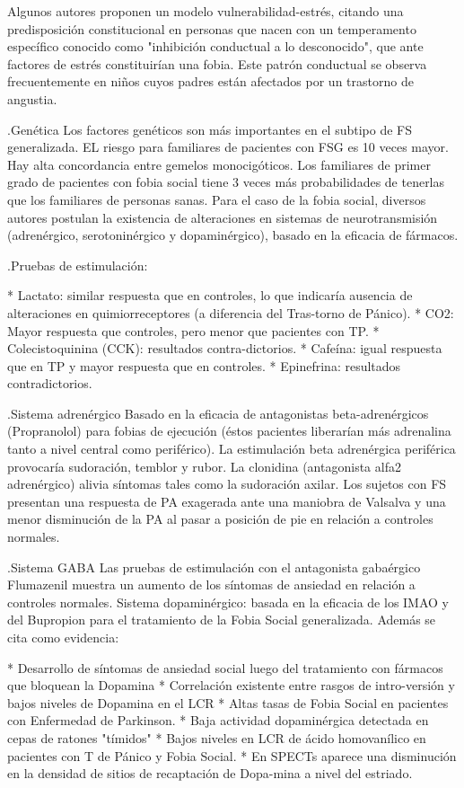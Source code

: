 Algunos autores proponen un modelo vulnerabilidad-estrés, citando una predisposición constitucional en personas que nacen con un temperamento específico conocido como "inhibición conductual a lo desconocido", que ante factores de estrés constituirían una fobia. Este patrón conductual se observa frecuentemente en niños cuyos padres están afectados por un trastorno de angustia.

.Genética
Los factores genéticos son más importantes en el subtipo de FS generalizada. EL riesgo para familiares de pacientes con FSG es 10 veces mayor. Hay alta concordancia entre gemelos monocigóticos. Los familiares de primer grado de pacientes con fobia social tiene 3 veces más probabilidades de tenerlas que los familiares de personas sanas. Para el caso de la fobia social, diversos autores postulan la existencia de alteraciones en sistemas de neurotransmisión (adrenérgico, serotoninérgico y dopaminérgico), basado en la eficacia de fármacos.

.Pruebas de estimulación:

* Lactato: similar respuesta que en controles, lo que indicaría ausencia de alteraciones en quimiorreceptores (a diferencia del Tras-torno de Pánico).
* CO2: Mayor respuesta que controles, pero menor que pacientes con TP.
* Colecistoquinina (CCK): resultados contra-dictorios.
* Cafeína: igual respuesta que en TP y mayor respuesta que en controles.
* Epinefrina: resultados contradictorios.

.Sistema adrenérgico
Basado en la eficacia de antagonistas beta-adrenérgicos (Propranolol) para fobias de ejecución (éstos pacientes liberarían más adrenalina tanto a nivel central como periférico). La estimulación beta adrenérgica periférica provocaría sudoración, temblor y rubor. La clonidina (antagonista alfa2 adrenérgico) alivia síntomas tales como la sudoración axilar. Los sujetos con FS presentan una respuesta de PA exagerada ante una maniobra de Valsalva y una menor disminución de la PA al pasar a posición de pie en relación a controles normales.

.Sistema GABA
Las pruebas de estimulación con el antagonista gabaérgico Flumazenil muestra un aumento de los síntomas de ansiedad en relación a controles normales. Sistema dopaminérgico: basada en la eficacia de los IMAO y del Bupropion para el tratamiento de la Fobia Social generalizada. Además se cita como evidencia:

* Desarrollo de síntomas de ansiedad social luego del tratamiento con fármacos que bloquean la Dopamina
* Correlación existente entre rasgos de intro-versión y bajos niveles de Dopamina en el LCR
* Altas tasas de Fobia Social en pacientes con Enfermedad de Parkinson.
* Baja actividad dopaminérgica detectada en cepas de ratones "tímidos"
* Bajos niveles en LCR de ácido homovanílico en pacientes con T de Pánico y Fobia Social.
* En SPECTs aparece una disminución en la densidad de sitios de recaptación de Dopa-mina a nivel del estriado.

